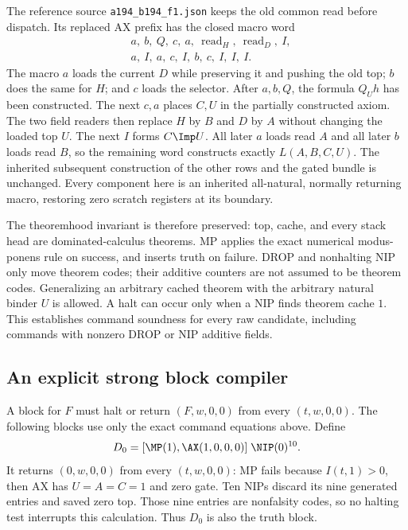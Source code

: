 The reference source \texttt{a194\_b194\_f1.json} keeps the old common
read before dispatch.  Its replaced AX prefix has the closed macro word
\[
 \begin{aligned}
 &a,\ b,\ Q,\ c,\ a,\ \operatorname{read}_H,\
       \operatorname{read}_D,\ I,\\
 &a,\ I,\ a,\ c,\ I,\ b,\ c,\ I,\ I,\ I.
 \end{aligned}
\]
The macro $a$ loads the current $D$ while preserving it and pushing the
old top; $b$ does the same for $H$; and $c$ loads the selector.
After $a,b,Q$, the formula $Q_Uh$ has been constructed.  The next $c,a$
places $C,U$ in the partially constructed axiom.  The two field readers
then replace $H$ by $B$ and $D$ by $A$ without changing the loaded top
$U$.  The next $I$ forms $C\Imp U$.  All later $a$ loads read $A$ and
all later $b$ loads read $B$, so the remaining word constructs exactly
$L(A,B,C,U)$.  The inherited subsequent construction of the other rows
and the gated bundle is unchanged.  Every component here is an inherited
all-natural, normally returning macro, restoring zero scratch registers
at its boundary.

The theoremhood invariant is therefore preserved: top, cache, and
every stack head are dominated-calculus theorems.  MP applies the exact
numerical modus-ponens rule on success, and inserts truth on failure.
DROP and nonhalting NIP only move theorem codes; their additive counters
are not assumed to be theorem codes.  Generalizing
an arbitrary cached theorem with the arbitrary natural binder $U$ is
allowed.  A halt can occur only when a NIP finds theorem cache $1$.
This establishes command soundness for every raw candidate, including
commands with nonzero DROP or NIP additive fields.

\subsection{An explicit strong block compiler}

A block for $F$ must halt or return $(F,w,0,0)$ from every $(t,w,0,0)$.
The following blocks use only the exact command equations above.
Define
\[
 D_0=[\MP(1),\AX(1,0,0,0)]\;\NIP(0)^{10}.
\]
It returns $(0,w,0,0)$ from every $(t,w,0,0)$: MP fails because
$I(t,1)>0$, then AX has $U=A=C=1$ and zero gate.  Ten NIPs discard its
nine generated entries and saved zero top.  Those nine entries are
nonfalsity codes, so no halting test interrupts this calculation.
Thus $D_0$ is also the truth block.

